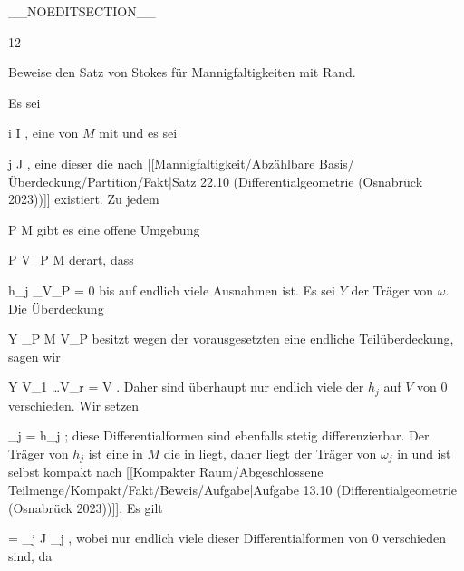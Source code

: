 __NOEDITSECTION__

{12}

{

Beweise den Satz von Stokes für Mannigfaltigkeiten mit Rand.

}
{

\teilbeweis {}{}{}
{Es sei

 {}
 {i \in I} {}
 {} {} {} {,}
eine
von $M$ mit
und es sei

 {}
 {j \in J} {}
 {} {} {} {,}
eine dieser
die nach
[[Mannigfaltigkeit/Abzählbare Basis/Überdeckung/Partition/Fakt|Satz 22.10 (Differentialgeometrie (Osnabrück 2023))]]
existiert. Zu jedem

\mavergleichskette
{\vergleichskette
{ P
}
{ \in }{ M
}
{  }{
}
{    }{
}
{   }{
}
}
{}{}{}
gibt es eine offene Umgebung

\mavergleichskette
{\vergleichskette
{ P
}
{ \in }{ V_P
}
{ \subseteq }{ M
}
{    }{
}
{   }{
}
}
{}{}{}
derart, dass

\mavergleichskette
{\vergleichskette
{ h_j \vert_{V_P }
}
{ = }{ 0
}
{  }{
}
{    }{
}
{   }{
}
}
{}{}{}
bis auf endlich viele Ausnahmen ist. Es sei $Y$ der Träger von $\omega$. Die Überdeckung

\mavergleichskette
{\vergleichskette
{ Y
}
{ \subseteq }{ \bigcup_{P \in M} V_P
}
{  }{
}
{    }{
}
{   }{
}
}
{}{}{}
besitzt wegen der vorausgesetzten
eine endliche Teilüberdeckung, sagen wir

\mavergleichskettedisp
{\vergleichskette
{ Y
}
{ \subseteq} { V_{1} \cup \ldots \cup V_{r}
}
{ =} { V
}
{ } {
}
{ } {
}
}
{}{}{.}
Daher sind überhaupt nur endlich viele der $h_j$ auf $V$ von $0$ verschieden. Wir setzen

\mavergleichskette
{\vergleichskette
{ \omega_j
}
{ = }{ h_j \omega
}
{  }{
}
{    }{
}
{   }{
}
}
{}{}{;}
diese Differentialformen sind ebenfalls stetig differenzierbar. Der Träger von $h_j$ ist eine in $M$
die in
 liegt, daher liegt der Träger von $\omega_j$ in
 und ist selbst kompakt nach
[[Kompakter Raum/Abgeschlossene Teilmenge/Kompakt/Fakt/Beweis/Aufgabe|Aufgabe 13.10 (Differentialgeometrie (Osnabrück 2023))]].
Es gilt

\mavergleichskettedisp
{\vergleichskette
{ \omega
}
{ =} { \sum_{j \in J} \omega_j
}
{ } {
}
{ } {
}
{ } {
}
}
{}{}{,}
wobei nur endlich viele dieser Differentialformen
 von $0$ verschieden sind, da

}}
